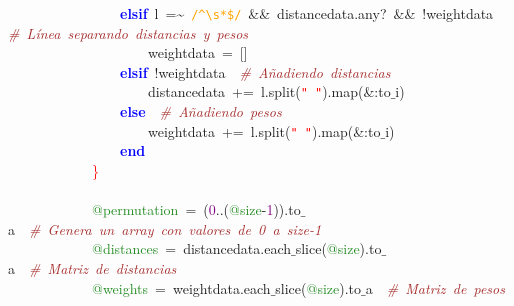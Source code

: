 \mbox{}\ \ \ \ \ \ \ \ \ \ \ \ \ \ \ \ \textbf{\textcolor{Blue}{elsif}}\ l\ \textcolor{BrickRed}{=\textasciitilde{}}\ \texttt{\textcolor{Orange}{/\textasciicircum{}\textbackslash{}s*\$/}}\ \textcolor{BrickRed}{\&\&}\ distancedata\textcolor{BrickRed}{.}any?\ \textcolor{BrickRed}{\&\&}\ \textcolor{BrickRed}{!}weightdata\ \ \textit{\textcolor{Brown}{\#\ Línea\ separando\ distancias\ y\ pesos}} \\
\mbox{}\ \ \ \ \ \ \ \ \ \ \ \ \ \ \ \ \ \ \ \ weightdata\ \textcolor{BrickRed}{=}\ \textcolor{BrickRed}{[]} \\
\mbox{}\ \ \ \ \ \ \ \ \ \ \ \ \ \ \ \ \textbf{\textcolor{Blue}{elsif}}\ \textcolor{BrickRed}{!}weightdata\ \ \textit{\textcolor{Brown}{\#\ Añadiendo\ distancias}} \\
\mbox{}\ \ \ \ \ \ \ \ \ \ \ \ \ \ \ \ \ \ \ \ distancedata\ \textcolor{BrickRed}{+=}\ l\textcolor{BrickRed}{.}split\textcolor{BrickRed}{(}\texttt{\textcolor{Red}{"{}\ "{}}}\textcolor{BrickRed}{).}map\textcolor{BrickRed}{(\&:}to$\_$i\textcolor{BrickRed}{)} \\
\mbox{}\ \ \ \ \ \ \ \ \ \ \ \ \ \ \ \ \textbf{\textcolor{Blue}{else}}\ \ \textit{\textcolor{Brown}{\#\ Añadiendo\ pesos}} \\
\mbox{}\ \ \ \ \ \ \ \ \ \ \ \ \ \ \ \ \ \ \ \ weightdata\ \textcolor{BrickRed}{+=}\ l\textcolor{BrickRed}{.}split\textcolor{BrickRed}{(}\texttt{\textcolor{Red}{"{}\ "{}}}\textcolor{BrickRed}{).}map\textcolor{BrickRed}{(\&:}to$\_$i\textcolor{BrickRed}{)} \\
\mbox{}\ \ \ \ \ \ \ \ \ \ \ \ \ \ \ \ \textbf{\textcolor{Blue}{end}} \\
\mbox{}\ \ \ \ \ \ \ \ \ \ \ \ \textcolor{Red}{\}} \\
\mbox{} \\
\mbox{}\ \ \ \ \ \ \ \ \ \ \ \ \textcolor{ForestGreen}{@permutation}\ \textcolor{BrickRed}{=}\ \textcolor{BrickRed}{(}\textcolor{Purple}{0}\textcolor{BrickRed}{..(}\textcolor{ForestGreen}{@size}\textcolor{BrickRed}{-}\textcolor{Purple}{1}\textcolor{BrickRed}{)).}to$\_$a\ \ \textit{\textcolor{Brown}{\#\ Genera\ un\ array\ con\ valores\ de\ 0\ a\ size-1}} \\
\mbox{}\ \ \ \ \ \ \ \ \ \ \ \ \textcolor{ForestGreen}{@distances}\ \textcolor{BrickRed}{=}\ distancedata\textcolor{BrickRed}{.}each$\_$slice\textcolor{BrickRed}{(}\textcolor{ForestGreen}{@size}\textcolor{BrickRed}{).}to$\_$a\ \ \textit{\textcolor{Brown}{\#\ Matriz\ de\ distancias}} \\
\mbox{}\ \ \ \ \ \ \ \ \ \ \ \ \textcolor{ForestGreen}{@weights}\ \textcolor{BrickRed}{=}\ weightdata\textcolor{BrickRed}{.}each$\_$slice\textcolor{BrickRed}{(}\textcolor{ForestGreen}{@size}\textcolor{BrickRed}{).}to$\_$a\ \ \textit{\textcolor{Brown}{\#\ Matriz\ de\ pesos}} \\

